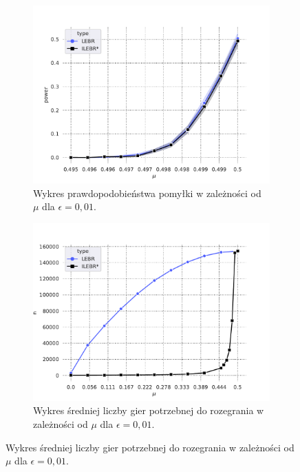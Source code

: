 \documentclass[inzynierska]{pwr_wmat_praca_dyplomowa}
\theoremstyle{plain}
\numberwithin{theorem}{chapter}
\theoremstyle{definition}
\numberwithin{theorem}{chapter}
\begin{document}
	\begin{figure}
		\captionsetup[subfigure]{width=0.8\textwidth}
		\centering
		\begin{subfigure}{0.8\textwidth}
			\includegraphics[width=1\linewidth]{imagens/test_powrs_same_n_max.pdf}
			\caption{Wykres prawdopodobieństwa pomyłki w zależności od $\mu$ dla $\epsilon=0,01$.}
			\label{fig:power_same_n_max}
		\end{subfigure}
		\begin{subfigure}{.5\textwidth}
			\centering
			\includegraphics[width=1\linewidth]{imagens/needed_games_to_play_same_n_max.pdf}
			\caption{Wykres średniej liczby gier potrzebnej do rozegrania w zależności od $\mu$ dla $\epsilon=0,01$.}
			\label{fig:power_same_n_max_log}

\end{subfigure}
\end{figure}
\end{document}
